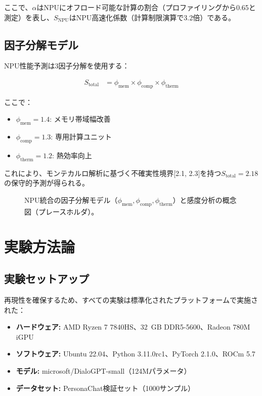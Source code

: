 \documentclass[10pt,twocolumn,a4paper]{jarticle}
\begin{document}
ここで、$\alpha$はNPUにオフロード可能な計算の割合（プロファイリングから0.65と測定）を表し、$S_{\text{NPU}}$はNPU高速化係数（計算制限演算で3.2倍）である。

\subsection{因子分解モデル}

NPU性能予測は3因子分解を使用する：

\begin{align}
S_{\text{total}} &= \phi_{\text{mem}} \times \phi_{\text{comp}} \times \phi_{\text{therm}} \label{eq:factors}
\end{align}

ここで：
\begin{itemize}
\item $\phi_{\text{mem}} = 1.4$: メモリ帯域幅改善
\item $\phi_{\text{comp}} = 1.3$: 専用計算ユニット
\item $\phi_{\text{therm}} = 1.2$: 熱効率向上
\end{itemize}

これにより、モンテカルロ解析に基づく不確実性境界[2.1, 2.3]を持つ$S_{\text{total}} = 2.18$の保守的予測が得られる。

\begin{figure}[t]
  \centering
  \fbox{\rule{0pt}{40mm}\rule{0.95\columnwidth}{0pt}}
  \caption{NPU統合の因子分解モデル（$\phi_{\text{mem}}, \phi_{\text{comp}}, \phi_{\text{therm}}$）と感度分析の概念図（プレースホルダ）。}
  \label{fig:npu_prediction}
\end{figure}

\section{実験方法論}

\subsection{実験セットアップ}

再現性を確保するため、すべての実験は標準化されたプラットフォームで実施された：

\begin{itemize}
\item \textbf{ハードウェア:} AMD Ryzen 7 7840HS、\SI{32}{GB} DDR5-5600、Radeon 780M iGPU
\item \textbf{ソフトウェア:} Ubuntu 22.04、Python 3.11.0rc1、PyTorch 2.1.0、ROCm 5.7
\item \textbf{モデル:} microsoft/DialoGPT-small（124Mパラメータ）
\item \textbf{データセット:} PersonaChat検証セット（1000サンプル）
\end{itemize}
\end{document}
